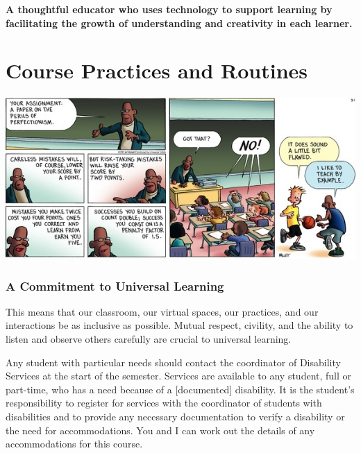 \documentclass{tufte-handout}
\begin{document}
\begin{framed}
	\begin{center}
		\small\noindent\textbf{A thoughtful educator who uses technology to support learning by facilitating the growth of understanding and creativity in each learner.}
	\end{center}
\end{framed}

\normalsize

\newpage

\part{Course Practices and Routines}

\begin{marginfigure}%
	\begin{center}
		\includegraphics[width=1\linewidth]{frazz-mistakes.png}
	\end{center}
\end{marginfigure}

\section{A Commitment to Universal Learning}
 This means that our classroom, our virtual spaces, our practices, and our interactions be as inclusive as possible. Mutual respect, civility, and the ability to listen and observe others carefully are crucial to universal learning.

Any student with particular needs should contact the coordinator of Disability Services at the start of the semester. Services are available to any student, full or part-time, who has a need because of a [documented] disability. It is the student's responsibility to register for services with the coordinator of students with disabilities and to provide any necessary documentation to verify a disability or the need for accommodations.  You and I can work out the details of any accommodations for this course.
\end{document}
